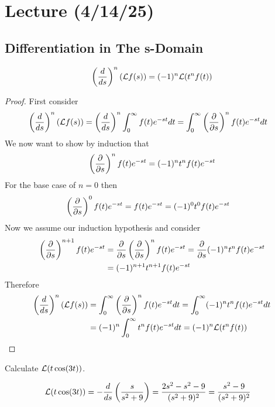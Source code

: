\documentclass[notes]{subfiles}
\begin{document}
\setcounter{section}{20}
\section{Lecture (4/14/25)}

\subsection{Differentiation in The s-Domain}
\begin{theorem}
    \[
        \left( \frac{d}{ds} \right)^n (\mathcal{L} f(s)) = (-1)^n\mathcal{L}(t^n f(t))
    \]
\end{theorem}
\begin{proof}
    First consider
    \begin{align*}
        \left( \frac{d}{ds} \right)^n (\mathcal{L} f(s))
        &= \left( \frac{d}{ds} \right)^n \int_0^\infty f(t)e^{-st}dt
        = \int_0^\infty \left( \frac{\partial}{\partial s} \right)^n f(t)e^{-st}dt
    \end{align*}
    We now want to show by induction that
    \[
        \left( \frac{\partial}{\partial s} \right)^n f(t)e^{-st} = (-1)^n t^n f(t)e^{-st}
    \]
    For the base case of $n = 0$ then
    \begin{align*}
        \left( \frac{\partial}{\partial s} \right)^0 f(t)e^{-st}
        &= f(t)e^{-st}
        = (-1)^0 t^0 f(t)e^{-st}
    \end{align*}
    Now we assume our induction hypothesis and consider
    \begin{align*}
        \left( \frac{\partial}{\partial s} \right)^{n + 1} f(t)e^{-st}
        &= \frac{\partial}{\partial s} \left( \frac{\partial}{\partial s} \right)^n f(t)e^{-st}
        = \frac{\partial}{\partial s} (-1)^n t^n f(t)e^{-st} \\
        &= (-1)^{n + 1} t^{n + 1} f(t)e^{-st}
    \end{align*}
    Therefore
    \begin{align*}
        \left( \frac{d}{ds} \right)^n (\mathcal{L} f(s))
        &= \int_0^\infty \left( \frac{\partial}{\partial s} \right)^n f(t)e^{-st}dt
        = \int_0^\infty (-1)^n t^n f(t)e^{-st}dt \\
        &= (-1)^n \int_0^\infty t^n f(t)e^{-st}dt
        = (-1)^n \mathcal{L}(t^n f(t))
    \end{align*}
\end{proof}

\begin{exercise}
    Calculate $\mathcal{L}(t\cos(3t))$.
\end{exercise}
\begin{solution}
    \begin{align*}
        \mathcal{L}(t\cos(3t))
        &= -\frac{d}{ds} \left(\frac{s}{s^2 + 9}\right)
        = \frac{2s^2 - s^2 - 9}{(s^2 + 9)^2}
        = \frac{s^2 - 9}{(s^2 + 9)^2}
    \end{align*}
\end{solution}
\end{document}

